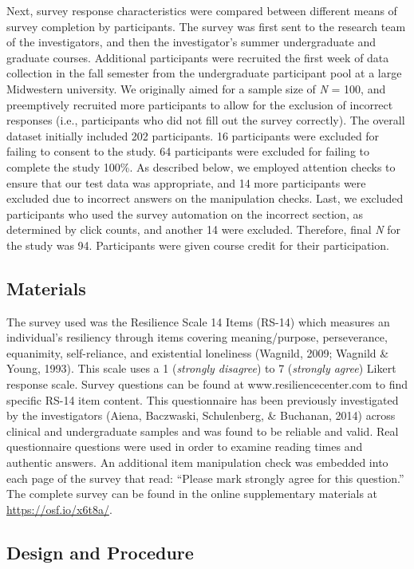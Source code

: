 \documentclass[english,man]{apa6}
\theoremstyle{definition}
\theoremstyle{definition}
\theoremstyle{definition}
\theoremstyle{remark}
\begin{document}
Next, survey response characteristics were compared between different
means of survey completion by participants. The survey was first sent to
the research team of the investigators, and then the investigator's
summer undergraduate and graduate courses. Additional participants were
recruited the first week of data collection in the fall semester from
the undergraduate participant pool at a large Midwestern university. We
originally aimed for a sample size of \emph{N} = 100, and preemptively
recruited more participants to allow for the exclusion of incorrect
responses (i.e., participants who did not fill out the survey
correctly). The overall dataset initially included 202 participants. 16
participants were excluded for failing to consent to the study. 64
participants were excluded for failing to complete the study 100\%. As
described below, we employed attention checks to ensure that our test
data was appropriate, and 14 more participants were excluded due to
incorrect answers on the manipulation checks. Last, we excluded
participants who used the survey automation on the incorrect section, as
determined by click counts, and another 14 were excluded. Therefore,
final \emph{N} for the study was 94. Participants were given course
credit for their participation.

\subsection{Materials}\label{materials}

The survey used was the Resilience Scale 14 Items (RS-14) which measures
an individual's resiliency through items covering meaning/purpose,
perseverance, equanimity, self-reliance, and existential loneliness
(Wagnild, 2009; Wagnild \& Young, 1993). This scale uses a 1
(\emph{strongly disagree}) to 7 (\emph{strongly agree}) Likert response
scale. Survey questions can be found at www.resiliencecenter.com to find
specific RS-14 item content. This questionnaire has been previously
investigated by the investigators (Aiena, Baczwaski, Schulenberg, \&
Buchanan, 2014) across clinical and undergraduate samples and was found
to be reliable and valid. Real questionnaire questions were used in
order to examine reading times and authentic answers. An additional item
manipulation check was embedded into each page of the survey that read:
\enquote{Please mark strongly agree for this question.} The complete
survey can be found in the online supplementary materials at
\url{https://osf.io/x6t8a/}.

\subsection{Design and Procedure}\label{design-and-procedure}
\end{document}
